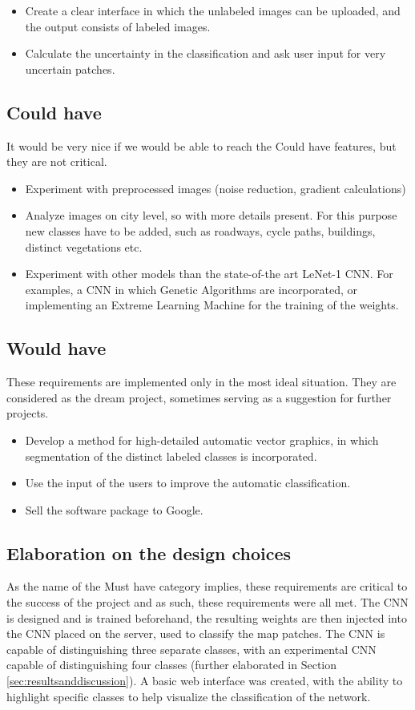 \documentclass[a4paper,onecolumn]{report}
\begin{document}
\begin{itemize}
\item Create a clear interface in which the unlabeled images can be uploaded, and the output consists of labeled images. 
\item Calculate the uncertainty in the classification and ask user input for very uncertain patches.
\end{itemize}

\subsection{Could have}
It would be very nice if we would be able to reach the Could have features, but they are not critical. 
\begin{itemize}
\item Experiment with preprocessed images (noise reduction, gradient calculations)
\item Analyze images on city level, so with more details present. For this purpose new classes have to be added, such as roadways, cycle paths, 	buildings, distinct vegetations etc. 
\item Experiment with other models than the state-of-the art LeNet-1 CNN. For examples, a CNN in which Genetic Algorithms are incorporated, or implementing an Extreme Learning Machine for the training of the weights. 
\end{itemize}

\subsection{Would have}
These requirements are implemented only in the most ideal situation. They are considered as the dream project, sometimes serving as a suggestion for further projects. 

\begin{itemize}
\item Develop a method for high-detailed automatic vector graphics, in which segmentation of the distinct labeled classes is incorporated.
\item Use the input of the users to improve the automatic classification. 
\item Sell the software package to Google. 
\end{itemize}

\subsection{Elaboration on the design choices}
As the name of the Must have category implies, these requirements are critical to the success of the project and as such, these requirements were all met. The CNN is designed and is trained beforehand, the resulting weights are then injected into the CNN placed on the server, used to classify the map patches. The CNN is capable of distinguishing three separate classes, with an experimental CNN capable of distinguishing four classes (further elaborated in Section \ref{sec:resultsanddiscussion}).
A basic web interface was created, with the ability to highlight specific classes to help visualize the classification of the network.
\end{document}
